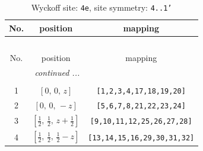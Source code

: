 \documentclass[fleqn,8pt]{jsarticle}
\begin{document}
\renewcommand{\arraystretch}{1.2}
\begin{longtable}{ccc}
\caption{Wyckoff site: {\tt 4e}, site symmetry: {\tt 4..1'}}
 \\
 \hline \hline
No. & position & mapping \\ \hline \endfirsthead

\multicolumn{2}{l}{\tablename\ \thetable{}} \\
 \hline \hline
No. & position & mapping \\ \hline \endhead

 \hline \hline
\multicolumn{2}{r}{\footnotesize\it continued ...} \\ \endfoot

 \hline \hline
\multicolumn{2}{r}{} \\ \endlastfoot

1 & $\left[ 0,\, 0,\, z \right]$ & {\tt [1,2,3,4,17,18,19,20]} \\ \hline
2 & $\left[ 0,\, 0,\, - z \right]$ & {\tt [5,6,7,8,21,22,23,24]} \\ \hline
3 & $\left[ \frac{1}{2},\, \frac{1}{2},\, z + \frac{1}{2} \right]$ & {\tt [9,10,11,12,25,26,27,28]} \\ \hline
4 & $\left[ \frac{1}{2},\, \frac{1}{2},\, \frac{1}{2} - z \right]$ & {\tt [13,14,15,16,29,30,31,32]} \\
\end{longtable}
\renewcommand{\arraystretch}{1.2}
\end{document}
